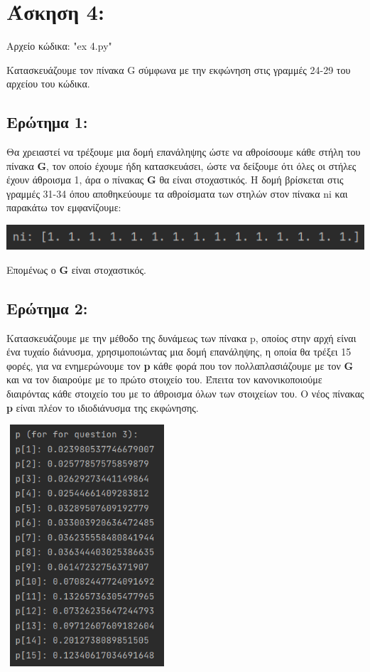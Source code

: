 \documentclass{article}
\begin{document}
\section{Άσκηση 4:}

Αρχείο κώδικα: "ex 4.py"

Κατασκευάζουμε τον πίνακα G σύμφωνα με την εκφώνηση στις γραμμές 24-29 του αρχείου του κώδικα.

\subsection{Ερώτημα 1:}
Θα χρειαστεί να τρέξουμε μια δομή επανάληψης ώστε να αθροίσουμε κάθε στήλη του πίνακα \textbf{G}, τον οποίο έχουμε ήδη κατασκευάσει, ώστε να δείξουμε ότι όλες οι στήλες έχουν άθροισμα 1, άρα ο πίνακας \textbf{G} θα είναι στοχαστικός. Η δομή βρίσκεται στις γραμμές 31-34 όπου αποθηκεύουμε τα αθροίσματα των στηλών στον πίνακα ni και παρακάτω τον εμφανίζουμε:

\begin{center}\includegraphics[]{images/results_25.png}\end{center}

Επομένως ο \textbf{G} είναι στοχαστικός.

\subsection{Ερώτημα 2:}
Κατασκευάζουμε με την μέθοδο της δυνάμεως των πίνακα p, οποίος στην αρχή είναι ένα τυχαίο διάνυσμα, χρησιμοποιώντας μια δομή επανάληψης, η οποία θα τρέξει 15 φορές, για να ενημερώνουμε τον \textbf{p} κάθε φορά που τον πολλαπλασιάζουμε με τον \textbf{G} και να τον διαιρούμε με το πρώτο στοιχείο του. Έπειτα τον κανονικοποιούμε διαιρόντας κάθε στοιχείο του με το άθροισμα όλων των στοιχείων του. Ο νέος πίνακας \textbf{p} είναι πλέον το ιδιοδιάνυσμα της εκφώνησης.

\begin{center}\includegraphics[width = 6cm, height = 9cm]{images/results_30.png}\end{center}
    
\end{document}
